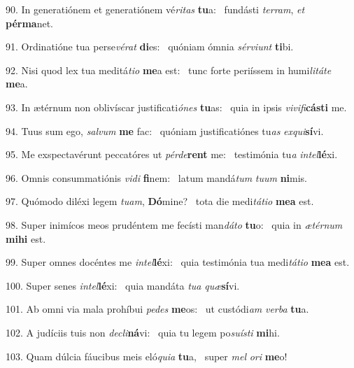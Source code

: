 90. In generatiónem et generatiónem vé\textit{ri}\textit{tas} \textbf{tu}a: \ast\  fundásti \textit{ter}\textit{ram}, \textit{et} \textbf{pér}\textbf{ma}net.\

91. Ordinatióne tua perse\textit{vé}\textit{rat} \textbf{di}es: \ast\  quóniam ómnia \textit{sér}\textit{vi}\textit{unt} \textbf{ti}bi.\

92. Nisi quod lex tua meditá\textit{ti}\textit{o} \textbf{me}a est: \ast\  tunc forte periíssem in humi\textit{li}\textit{tá}\textit{te} \textbf{me}a.\

93. In ætérnum non oblivíscar justificati\textit{ó}\textit{nes} \textbf{tu}as: \ast\  quia in ipsis \textit{vi}\textit{vi}\textit{fi}\textbf{cás}\textbf{ti} me.\

94. Tuus sum ego, \textit{sal}\textit{vum} \textbf{me} fac: \ast\  quóniam justificatiónes tu\textit{as} \textit{ex}\textit{qui}\textbf{sí}vi.\

95. Me exspectavérunt peccatóres ut \textit{pér}\textit{de}\textbf{rent} me: \ast\  testimónia tu\textit{a} \textit{in}\textit{tel}\textbf{lé}xi.\

96. Omnis consummatiónis \textit{vi}\textit{di} \textbf{fi}nem: \ast\  latum mandá\textit{tum} \textit{tu}\textit{um} \textbf{ni}mis.\

97. Quómodo diléxi legem \textit{tu}\textit{am}, \textbf{Dó}mine? \ast\  tota die medi\textit{tá}\textit{ti}\textit{o} \textbf{me}\textbf{a} est.\

98. Super inimícos meos prudéntem me fecísti man\textit{dá}\textit{to} \textbf{tu}o: \ast\  quia in \textit{æ}\textit{tér}\textit{num} \textbf{mi}\textbf{hi} est.\

99. Super omnes docéntes me \textit{in}\textit{tel}\textbf{lé}xi: \ast\  quia testimónia tua medi\textit{tá}\textit{ti}\textit{o} \textbf{me}\textbf{a} est.\

100. Super senes \textit{in}\textit{tel}\textbf{lé}xi: \ast\  quia mandáta \textit{tu}\textit{a} \textit{quæ}\textbf{sí}vi.\

101. Ab omni via mala prohíbui \textit{pe}\textit{des} \textbf{me}os: \ast\  ut custódi\textit{am} \textit{ver}\textit{ba} \textbf{tu}a.\

102. A judíciis tuis non \textit{de}\textit{cli}\textbf{ná}vi: \ast\  quia tu legem po\textit{su}\textit{ís}\textit{ti} \textbf{mi}hi.\

103. Quam dúlcia fáucibus meis eló\textit{qui}\textit{a} \textbf{tu}a, \ast\  super \textit{mel} \textit{o}\textit{ri} \textbf{me}o!\


